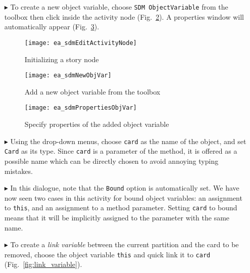 \begin{itemize}
\item[$\blacktriangleright$] To create a new object variable, choose \texttt{SDM ObjectVariable} from the toolbox then click inside the activity node
(Fig.~\ref{fig:tool_box}). A properties window will automatically appear (Fig.~\ref{fig:object_variable_properties}).

\begin{figure}[htpb]
\begin{center} 
  \texttt{[image: ea\_sdmEditActivityNode]}
  \caption{Initializing a story node}  
  \label{fig:story_pattern}
\end{center}
\end{figure}

\begin{figure}[htp]
\begin{center}
  \texttt{[image: ea\_sdmNewObjVar]}
  \caption{Add a new object variable from the toolbox}  
  \label{fig:tool_box}
\end{center}
\end{figure}

\newpage

\vspace{0.5cm}

\begin{figure}[htp]
\begin{center}
  \texttt{[image: ea\_sdmPropertiesObjVar]}
  \caption{Specify properties of the added object variable}  
  \label{fig:object_variable_properties}
\end{center}
\end{figure}


\item[$\blacktriangleright$] Using the drop-down menus, choose \texttt{card} as the name of the object, and set \texttt{Card} as its type.
Since \texttt{card} is a parameter of the method, it is offered as a possible name which can be directly chosen to avoid annoying typing mistakes.

\item[$\blacktriangleright$] In this dialogue, note that the \texttt{Bound} option is automatically set. We have now seen two cases in this activity for bound
object variables: an assignment to \texttt{this}, and an assignment to a method parameter. Setting \texttt{card} to bound means that it will be implicitly
assigned to the parameter with the same name.

\item[$\blacktriangleright$] To create a \emph{link variable} between the current partition and the card to be removed, choose the object variable \texttt{this}
and quick link it to \texttt{card} (Fig.~\ref{fig:link_variable}).


\end{itemize}
